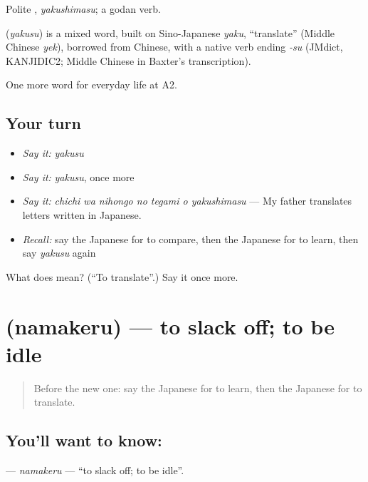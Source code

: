 Polite \textbf{}, \emph{yakushimasu}; a godan verb.

\begin{cousinweb}
\textbf{} (\emph{yakusu}) is a mixed word, built on Sino-Japanese \emph{yaku}, \textquotedblleft{}translate\textquotedblright{} (Middle Chinese \emph{yek}), borrowed from Chinese, with a native verb ending \emph{-su} (JMdict, KANJIDIC2; Middle Chinese in Baxter's transcription).
\end{cousinweb}

\begin{grammarlens}[title={What you've built}]
One more word for everyday life at A2.
\end{grammarlens}

\subsection*{Your turn}
\begin{itemize}
\raggedright
  \item \emph{Say it:} \emph{yakusu}
  \item \emph{Say it:} \emph{yakusu}, once more
  \item \emph{Say it:} \emph{chichi wa nihongo no tegami o yakushimasu} — My father translates letters written in Japanese.
  \item \emph{Recall:} say the Japanese for to compare, then the Japanese for to learn, then say \emph{yakusu} again
\end{itemize}

\begin{tcolorbox}[breakable,colback=teal!4,colframe=teal!35!black,title={Before you move on}]
What does  mean? (\textquotedblleft{}To translate\textquotedblright{}.) Say it once more.
\end{tcolorbox}
\section[\texorpdfstring{\ja{なまける} (namakeru)}{なまける (namakeru)}]{ (namakeru) — to slack off; to be idle}

\label{lesson:JA-C228-namakeru}



\begin{quote}
Before the new one: say the Japanese for to learn, then the Japanese for to translate.
\end{quote}

\subsection*{You'll want to know: }
\textbf{} — \emph{namakeru} — \textquotedblleft{}to slack off; to be idle\textquotedblright{}.

